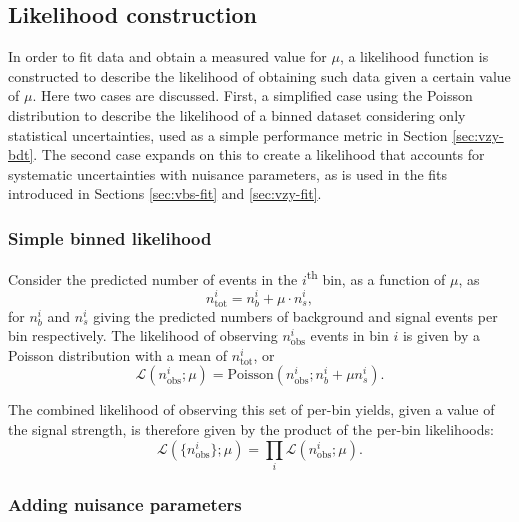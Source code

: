 \subsection{Likelihood construction}

In order to fit data and obtain a measured value for $\mu$, a likelihood
function is constructed to describe the likelihood of obtaining such data given
a certain value of $\mu$. Here two cases are discussed. First, a simplified
case using the Poisson distribution to describe the likelihood of a
binned dataset considering only statistical uncertainties, used as a simple
performance metric in Section \ref{sec:vzy-bdt}. The second case expands on this
to create a likelihood that accounts for systematic uncertainties with nuisance
parameters, as is used in the fits introduced in Sections \ref{sec:vbs-fit} and
\ref{sec:vzy-fit}.

\subsubsection{Simple binned likelihood}
\label{sec:methods-stats-llh-simple}

\newcommand\nobsi{\ensuremath{n_\text{obs}^i}\xspace}
Consider the predicted number of events in the $i$\textsuperscript{th} bin,
as a function of $\mu$, as
\begin{equation}
  n_\text{tot}^i = n_b^i + \mu\cdot n_s^i,
\end{equation}
for $n_b^i$ and $n_s^i$
giving the predicted numbers of background and signal events per bin
respectively. The likelihood of observing \nobsi events in bin $i$ is
given by a Poisson distribution with a mean of $n_\text{tot}^i$, or
\begin{equation*}
  \mathcal{L}(\nobsi;\mu) = \text{Poisson}(\nobsi; n_b^i + \mu n_s^i).
  \label{eqn:methods-stats-llh-perbin}
\end{equation*}

The combined likelihood of observing this set of per-bin yields, given a value
of the signal strength, is therefore given by the product of the per-bin
likelihoods:
\begin{equation}
  \mathcal{L}(\{\nobsi\};\mu) = \prod_i \mathcal{L}(\nobsi;\mu).
  \label{eqn:methods-stats-llh-total}
\end{equation}

\subsubsection{Adding nuisance parameters}

